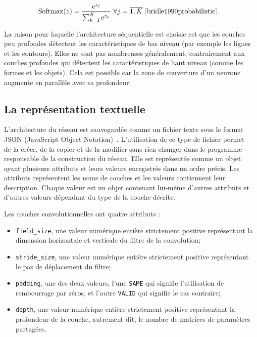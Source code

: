 $$
\mathrm{Softmax}(z) = \frac{\mathrm{e}^{z_j}}{\sum^K_{k=1}\mathrm{e}^{z_k}}~\forall{j=\overline{1,K}}~\cite{bridle1990probabilistic}.
$$

La raison pour laquelle l'architecture séquentielle est choisie est que les
couches peu profondes détectent
les caractéristiques de bas niveau (par exemple les lignes et les contours). Elles
ne sont pas nombreuses généralement, contrairement aux couches profondes qui détectent
les caractéristiques de haut niveau (comme les formes et les objets).
Cela est possible car la zone de couverture d'un neurone
augmente en parallèle avec sa profondeur.~\cite{michael2015neural,Goodfellow-et-al-2016}

\subsection{La représentation textuelle}

L'architecture du réseau est sauvegardée comme un fichier texte sous le format
JSON (JavaScript Object Notation)~\cite{introducing2012ecma}.
L'utilisation de ce type de fichier
permet de la créer, de la copier et de la modifier sans rien changer dans le
programme responsable de la construction du réseau. Elle est représentée comme un objet
ayant plusieurs attributs et leurs valeurs enregistrés dans un ordre précis.
Les attributs représentent les noms de couches et les valeurs contiennent
leur description. Chaque valeur est un objet contenant lui-même d'autres attributs
et d'autres valeurs dépendant du type de la couche décrite.

Les couches convolutionnelles ont quatre attributs :

\begin{itemize}
  \item \texttt{field\_size}, une valeur numérique entière strictement positive
  représentant la dimension horizontale et verticale du filtre de la convolution;
  \item \texttt{stride\_size}, une valeur numérique entière strictement positive
  représentant le pas de déplacement du filtre;
  \item \texttt{padding}, une des deux valeurs, l'une \texttt{SAME} qui signifie
  l'utilisation de rembourrage par zéros, et l'autre \texttt{VALID} qui signifie le cas
  contraire;
  \item \texttt{depth}, une valeur numérique entière strictement positive représentant
  la profondeur de la couche, autrement dit, le nombre de matrices de paramètres
  partagées.
\end{itemize}

